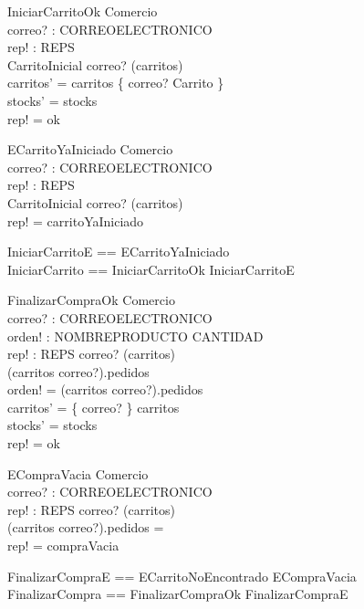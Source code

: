 \documentclass[11pt]{article}
\begin{document}

\begin{schema}{IniciarCarritoOk}
\Delta Comercio \\
correo? : CORREOELECTRONICO \\
rep! : REPS \\
CarritoInicial
\where
correo? \notin (\dom carritos) \\
carritos' = carritos \cup \{ correo? \mapsto \theta Carrito \} \\
stocks' = stocks \\
rep! = ok
\end{schema}

\begin{schema}{ECarritoYaIniciado}
\Xi Comercio \\
correo? : CORREOELECTRONICO \\
rep! : REPS \\
CarritoInicial
\where
correo? \in (\dom carritos) \\
rep! = carritoYaIniciado
\end{schema}

\begin{zed}
IniciarCarritoE == ECarritoYaIniciado \\
IniciarCarrito == IniciarCarritoOk \lor IniciarCarritoE
\end{zed}


\begin{schema}{FinalizarCompraOk}
\Delta Comercio \\
correo? : CORREOELECTRONICO \\
orden! : NOMBREPRODUCTO \pfun CANTIDAD \\
rep! : REPS
\where
correo? \in (\dom carritos) \\
(carritos \; correo?).pedidos \neq \emptyset \\
orden! = (carritos \; correo?).pedidos \\
carritos' = \{ correo? \} \ndres carritos \\
stocks' = stocks \\
rep! = ok
\end{schema}

\begin{schema}{ECompraVacia}
\Xi Comercio \\
correo? : CORREOELECTRONICO \\
rep! : REPS
\where
correo? \notin (\dom carritos) \\
(carritos \; correo?).pedidos = \emptyset \\
rep! = compraVacia
\end{schema}

\begin{zed}
FinalizarCompraE == ECarritoNoEncontrado \lor ECompraVacia \\
FinalizarCompra == FinalizarCompraOk \lor FinalizarCompraE
\end{zed}
\end{document}
